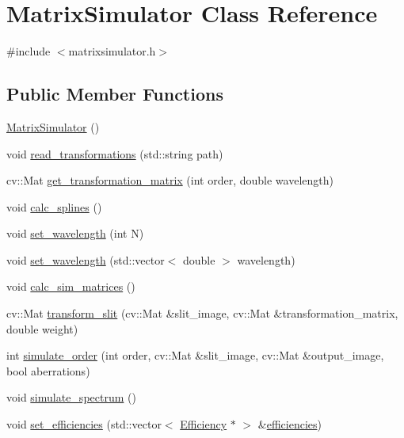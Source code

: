 \hypertarget{class_matrix_simulator}{}\section{Matrix\+Simulator Class Reference}
\label{class_matrix_simulator}


{\ttfamily \#include $<$matrixsimulator.\+h$>$}

\subsection*{Public Member Functions}
\begin{DoxyCompactItemize}
\item 
\hyperlink{class_matrix_simulator_ae3feb47ab98f917ad0b8b4b53d1b34aa}{Matrix\+Simulator} ()
\item 
void \hyperlink{class_matrix_simulator_a7d6123f82db49f9054228c31ba5dd44e}{read\+\_\+transformations} (std\+::string path)
\item 
cv\+::\+Mat \hyperlink{class_matrix_simulator_a5bdb033cbabf36fdd7f57a92f65dbec6}{get\+\_\+transformation\+\_\+matrix} (int order, double wavelength)
\item 
void \hyperlink{class_matrix_simulator_aa584302cfbfc8d5f02f184282bd60584}{calc\+\_\+splines} ()
\item 
void \hyperlink{class_matrix_simulator_a516c57a6e2d27e249202c60bd0fb5cc6}{set\+\_\+wavelength} (int N)
\item 
void \hyperlink{class_matrix_simulator_a85e8651b0a540ae40b3352ee73ed1c11}{set\+\_\+wavelength} (std\+::vector$<$ double $>$ wavelength)
\item 
void \hyperlink{class_matrix_simulator_a225df602310e87aa476faafafb08bb48}{calc\+\_\+sim\+\_\+matrices} ()
\item 
cv\+::\+Mat \hyperlink{class_matrix_simulator_a3016ecb082ba87ef7594928c14d74694}{transform\+\_\+slit} (cv\+::\+Mat \&slit\+\_\+image, cv\+::\+Mat \&transformation\+\_\+matrix, double weight)
\item 
int \hyperlink{class_matrix_simulator_a48920e35ea386faca140453878c4ed38}{simulate\+\_\+order} (int order, cv\+::\+Mat \&slit\+\_\+image, cv\+::\+Mat \&output\+\_\+image, bool aberrations)
\item 
void \hyperlink{class_matrix_simulator_a92cbe25d3d5317dac8ded3d974710bbd}{simulate\+\_\+spectrum} ()
\item 
void \hyperlink{class_matrix_simulator_aed5d9befa4e4c4af5e6331a836d25e6c}{set\+\_\+efficiencies} (std\+::vector$<$ \hyperlink{class_efficiency}{Efficiency} $\ast$ $>$ \&\hyperlink{class_matrix_simulator_a05c00fb5164a5faa987da2642b899035}{efficiencies})

\end{DoxyCompactItemize}
